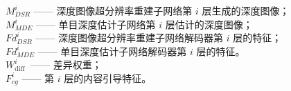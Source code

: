 \documentclass[aspectratio=169,12pt]{beamer}
\begin{document}
\begin{frame}[t]
{\begin{columns}
\begin{column}{0.6\textwidth}
				$M_{D S R}^{i}$ —— 深度图像超分辨率重建子网络第 $i$ 层生成的深度图像；\\[0.2em]
				$M_{M D E}^{i}$ —— 单目深度估计子网络第 $i$ 层估计的深度图像；\\[0.2em]   
				$F d_{D S R}^{i}$ —— 深度图像超分辨率重建子网络解码器第 $i$ 层的特征；\\[0.2em]
				$F d_{M D E}^{i}$ —— 单目深度估计子网络解码器第 $i$ 层的特征。\\[0.2em]
				$W_{\text {diff }}^{i}$ —— 差异权重；\\[0.2em]
				$F_{c g}^{i}$ —— 第 $i$ 层的内容引导特征。

			\end{column}

		\end{columns}

	}
\end{frame}
\end{document}
